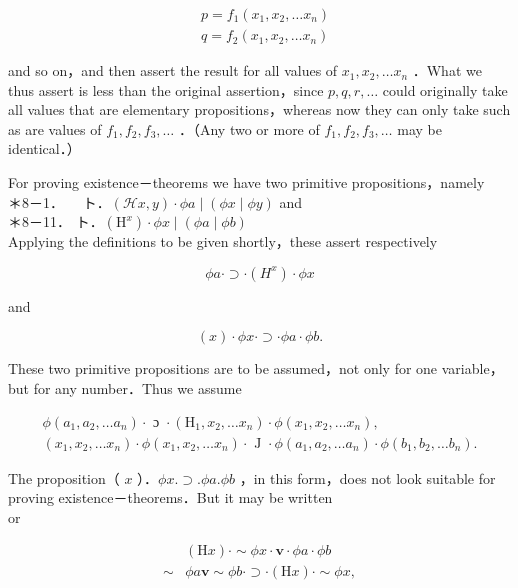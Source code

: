 \documentclass[10pt]{article}
\begin{document}
$$
\begin{aligned}
& p=f_{1}\left(x_{1}, x_{2}, \ldots x_{n}\right) \\
& q=f_{2}\left(x_{1}, x_{2}, \ldots x_{n}\right)
\end{aligned}
$$

and so on，and then assert the result for all values of $x_{1}, x_{2}, \ldots x_{n}$ ．What we thus assert is less than the original assertion，since $p, q, r, \ldots$ could originally take all values that are elementary propositions，whereas now they can only take such as are values of $f_{1}, f_{2}, f_{3}, \ldots$ ．（Any two or more of $f_{1}, f_{2}, f_{3}, \ldots$ may be identical．）

For proving existence－theorems we have two primitive propositions，namely\\
＊8－1．$\quad$ ト．$(\mathcal{H} x, y) \cdot \phi a \mid(\phi x \mid \phi y)$ and\\
＊8－11． ト．$\left(\mathrm{H}^{x}\right) \cdot \phi x \mid(\phi a \mid \phi b)$\\
Applying the definitions to be given shortly，these assert respectively

$$
\phi a \cdot \supset \cdot\left(H^{x}\right) \cdot \phi x
$$

and

$$
(x) \cdot \phi x \cdot \supset \cdot \phi a \cdot \phi b .
$$

These two primitive propositions are to be assumed，not only for one variable， but for any number．Thus we assume

$$
\begin{gathered}
\phi\left(a_{1}, a_{2}, \ldots a_{n}\right) \cdot \text { ɔ } \cdot\left(\mathrm{H}_{1}, x_{2}, \ldots x_{n}\right) \cdot \phi\left(x_{1}, x_{2}, \ldots x_{n}\right), \\
\left(x_{1}, x_{2}, \ldots x_{n}\right) \cdot \phi\left(x_{1}, x_{2}, \ldots x_{n}\right) \cdot \text { J } \cdot \phi\left(a_{1}, a_{2}, \ldots a_{n}\right) \cdot \phi\left(b_{1}, b_{2}, \ldots b_{n}\right) .
\end{gathered}
$$

The proposition（ $x$ ）．$\phi x . \supset . \phi a . \phi b$ ，in this form，does not look suitable for proving existence－theorems．But it may be written\\
or

$$
\begin{aligned}
& (\mathrm{H} x) \cdot \sim \phi x \cdot \mathbf{v} \cdot \phi a \cdot \phi b \\
\sim & \phi a \mathbf{v} \sim \phi b \cdot \supset \cdot(\mathrm{H} x) \cdot \sim \phi x,
\end{aligned}
$$
\end{document}
